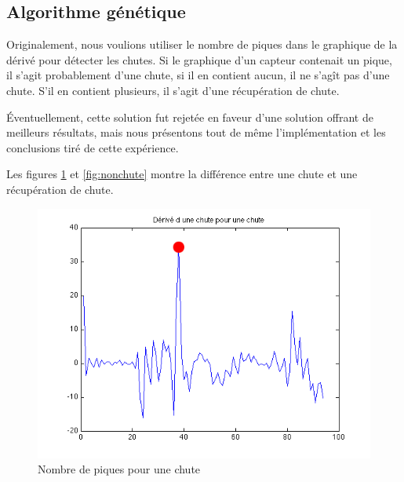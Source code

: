 \documentclass[12pt,letterpaper]{article}
\begin{document}
\subsection{Algorithme génétique}

Originalement, nous voulions utiliser le nombre de piques dans le graphique de la dérivé pour détecter les chutes.
Si le graphique d'un capteur contenait un pique, il s'agit probablement d'une chute, si il en contient aucun, il
ne s'agît pas d'une chute. S’il en contient plusieurs, il s'agit d'une récupération de chute.

Éventuellement, cette solution fut rejetée en faveur d'une solution offrant de meilleurs résultats, mais nous
présentons tout de même l'implémentation et les conclusions tiré de cette expérience.

Les figures \ref{fig:chute} et \ref{fig:nonchute} montre la différence entre une chute et une récupération de chute.

\begin{figure}[htp]
\centering
\includegraphics{images/piques_chute.png}
\caption{Nombre de piques pour une chute}
\label{fig:chute}
\end{figure}
\end{document}
